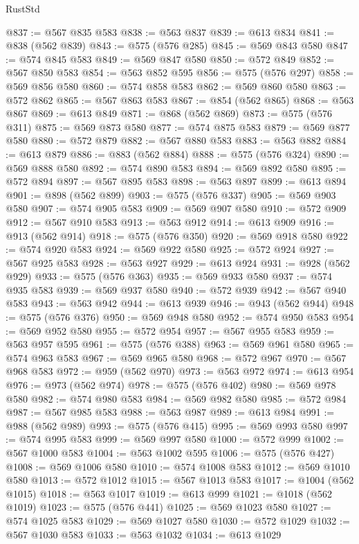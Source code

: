 \begin{lexlean}{RustStd}
\begin{coremodule}
@837 := @567 @835 @583
@838 := @563 @837
@839 := @613 @834
@841 := @838 (@562 @839)
@843 := @575 (@576 @285)
@845 := @569 @843 @580
@847 := @574 @845 @583
@849 := @569 @847 @580
@850 := @572 @849
@852 := @567 @850 @583
@854 := @563 @852 @595
@856 := @575 (@576 @297)
@858 := @569 @856 @580
@860 := @574 @858 @583
@862 := @569 @860 @580
@863 := @572 @862
@865 := @567 @863 @583
@867 := @854 (@562 @865)
@868 := @563 @867
@869 := @613 @849
@871 := @868 (@562 @869)
@873 := @575 (@576 @311)
@875 := @569 @873 @580
@877 := @574 @875 @583
@879 := @569 @877 @580
@880 := @572 @879
@882 := @567 @880 @583
@883 := @563 @882
@884 := @613 @879
@886 := @883 (@562 @884)
@888 := @575 (@576 @324)
@890 := @569 @888 @580
@892 := @574 @890 @583
@894 := @569 @892 @580
@895 := @572 @894
@897 := @567 @895 @583
@898 := @563 @897
@899 := @613 @894
@901 := @898 (@562 @899)
@903 := @575 (@576 @337)
@905 := @569 @903 @580
@907 := @574 @905 @583
@909 := @569 @907 @580
@910 := @572 @909
@912 := @567 @910 @583
@913 := @563 @912
@914 := @613 @909
@916 := @913 (@562 @914)
@918 := @575 (@576 @350)
@920 := @569 @918 @580
@922 := @574 @920 @583
@924 := @569 @922 @580
@925 := @572 @924
@927 := @567 @925 @583
@928 := @563 @927
@929 := @613 @924
@931 := @928 (@562 @929)
@933 := @575 (@576 @363)
@935 := @569 @933 @580
@937 := @574 @935 @583
@939 := @569 @937 @580
@940 := @572 @939
@942 := @567 @940 @583
@943 := @563 @942
@944 := @613 @939
@946 := @943 (@562 @944)
@948 := @575 (@576 @376)
@950 := @569 @948 @580
@952 := @574 @950 @583
@954 := @569 @952 @580
@955 := @572 @954
@957 := @567 @955 @583
@959 := @563 @957 @595
@961 := @575 (@576 @388)
@963 := @569 @961 @580
@965 := @574 @963 @583
@967 := @569 @965 @580
@968 := @572 @967
@970 := @567 @968 @583
@972 := @959 (@562 @970)
@973 := @563 @972
@974 := @613 @954
@976 := @973 (@562 @974)
@978 := @575 (@576 @402)
@980 := @569 @978 @580
@982 := @574 @980 @583
@984 := @569 @982 @580
@985 := @572 @984
@987 := @567 @985 @583
@988 := @563 @987
@989 := @613 @984
@991 := @988 (@562 @989)
@993 := @575 (@576 @415)
@995 := @569 @993 @580
@997 := @574 @995 @583
@999 := @569 @997 @580
@1000 := @572 @999
@1002 := @567 @1000 @583
@1004 := @563 @1002 @595
@1006 := @575 (@576 @427)
@1008 := @569 @1006 @580
@1010 := @574 @1008 @583
@1012 := @569 @1010 @580
@1013 := @572 @1012
@1015 := @567 @1013 @583
@1017 := @1004 (@562 @1015)
@1018 := @563 @1017
@1019 := @613 @999
@1021 := @1018 (@562 @1019)
@1023 := @575 (@576 @441)
@1025 := @569 @1023 @580
@1027 := @574 @1025 @583
@1029 := @569 @1027 @580
@1030 := @572 @1029
@1032 := @567 @1030 @583
@1033 := @563 @1032
@1034 := @613 @1029

\end{coremodule}
\end{lexlean}
